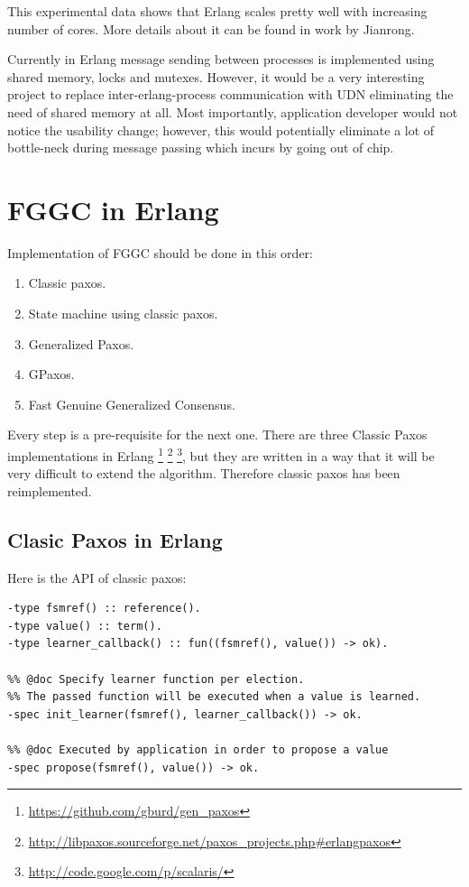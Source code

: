 \documentclass[english,11pt]{l4proj}
\newcommand{\fggc}{Fast Genuine Generalized Consensus}
\begin{document}
This experimental data shows that Erlang scales pretty well with increasing
number of cores. More details about it can be found in work by
Jianrong\cite{erlang-manycore-scalability}.

Currently in Erlang message sending between processes is implemented using
shared memory, locks and mutexes. However, it would be a very interesting
project to replace inter-erlang-process communication with UDN eliminating the
need of shared memory at all. Most importantly, application developer would not
notice the usability change; however, this would potentially eliminate a lot of
bottle-neck during message passing which incurs by going out of chip.

\section{FGGC in Erlang}
\label{sec:paxos-api}

Implementation of FGGC should be done in this order:

\begin{enumerate}
    \item Classic paxos.
    \item State machine using classic paxos.
    \item Generalized Paxos.
    \item GPaxos.
    \item \fggc.
\end{enumerate}

Every step is a pre-requisite for the next one. There are three Classic Paxos
implementations in Erlang \footnote{\url{https://github.com/gburd/gen\_paxos}}
\footnote{\url{http://libpaxos.sourceforge.net/paxos\_projects.php\#erlangpaxos}}
\footnote{\url{http://code.google.com/p/scalaris/}}, but they are written in a
way that it will be very difficult to extend the algorithm. Therefore classic
paxos has been reimplemented.

\subsection{Clasic Paxos in Erlang}

Here is the API of classic paxos:

\begin{verbatim}
-type fsmref() :: reference().
-type value() :: term().
-type learner_callback() :: fun((fsmref(), value()) -> ok).

%% @doc Specify learner function per election.
%% The passed function will be executed when a value is learned.
-spec init_learner(fsmref(), learner_callback()) -> ok.

%% @doc Executed by application in order to propose a value
-spec propose(fsmref(), value()) -> ok.
\end{verbatim}
\end{document}
